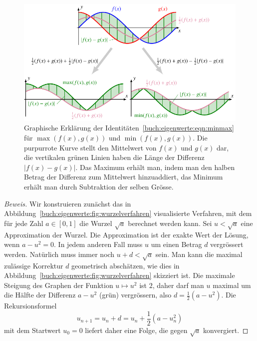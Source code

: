 \begin{figure}
\centering
\includegraphics{chapters/40-eigenwerte/images/minmax.pdf}
\caption{Graphische Erklärung der
Identitäten~\eqref{buch:eigenwerte:eqn:minmax} für
$\max(f(x),g(x))$ und $\min(f(x),g(x))$.
Die purpurrote Kurve stellt den Mittelwert von $f(x)$ und $g(x)$ dar,
die vertikalen grünen Linien haben die Länge der Differenz $|f(x)-g(x)|$.
Das Maximum erhält man, indem man den halben Betrag der Differenz zum
Mittelwert hinzuaddiert, das Minimum erhält man durch Subtraktion
der selben Grösse.
\label{buch:eigenwerte:fig:minmax}}
\end{figure}

\begin{proof}[Beweis]
Wir konstruieren zunächst das in
Abbildung~\ref{buch:eigenwerte:fig:wurzelverfahren}
visualisierte Verfahren, mit dem für jede Zahl $a\in[0,1]$
die Wurzel $\sqrt{a}$ berechnet werden kann.
Sei $u < \sqrt{a}$ eine Approximation der Wurzel.
Die Approximation ist der exakte Wert der Lösung, wenn $a-u^2=0$.
In jedem anderen Fall muss $u$ um einen Betrag $d$ vergrössert werden.
Natürlich muss immer noch $u+d<\sqrt{a}$ sein.
Man kann die maximal zulässige Korrektur $d$ geometrisch abschätzen,
wie dies in Abbildung~\ref{buch:eigenwerte:fig:wurzelverfahren}
skizziert ist.
Die maximale Steigung des Graphen der Funktion $u\mapsto u^2$ ist $2$,
daher darf man $u$ maximal um die Hälfte der Differenz $a-u^2$ (grün)
vergrössern, also $d=\frac12(a-u^2)$.
Die Rekursionsformel
\[
u_{n+1} = u_n + d = u_n + \frac12(a-u_n^2)
\]
mit dem Startwert $u_0=0$ liefert daher eine 
Folge, die gegen $\sqrt{a}$ konvergiert.
\end{proof}

